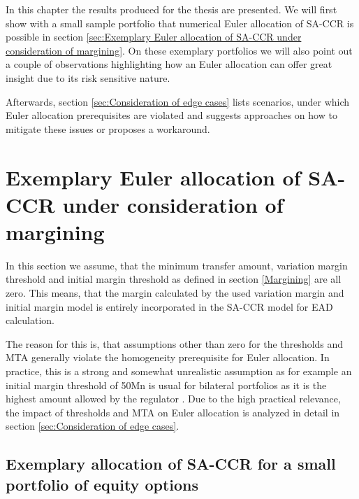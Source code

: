 \documentclass[../Thesis_AHoecherl.tex]{subfiles}
\begin{document}
    In this chapter the results produced for the thesis are presented. We will first show with a small sample portfolio that numerical Euler allocation of SA-CCR is possible in section \ref{sec:Exemplary Euler allocation of SA-CCR under consideration of margining}. On these exemplary portfolios we will also point out a couple of observations highlighting how an Euler allocation can offer great insight due to its risk sensitive nature.

    Afterwards, section \ref{sec:Consideration of edge cases} lists scenarios, under which Euler allocation prerequisites are violated and suggests approaches on how to mitigate these issues or proposes a workaround.

    \section{Exemplary Euler allocation of SA-CCR under consideration of margining\label{sec:Exemplary Euler allocation of SA-CCR under consideration of margining}}

    In this section we assume, that the minimum transfer amount, variation margin threshold and initial margin threshold as defined in section \ref{Margining} are all zero. This means, that the margin calculated by the used variation margin and initial margin model is entirely incorporated in the SA-CCR model for EAD calculation.

    The reason for this is, that assumptions other than zero for the thresholds and MTA generally violate the homogeneity prerequisite for Euler allocation. In practice, this is a strong and somewhat unrealistic assumption as for example an initial margin threshold of 50Mn is usual for bilateral portfolios as it is the highest amount allowed by the regulator \cite[Requirement 2.2]{BCBS_MarginRequirements}. Due to the high practical relevance, the impact of thresholds and MTA on Euler allocation is analyzed in detail in section \ref{sec:Consideration of edge cases}.   

    \subsection{Exemplary allocation of SA-CCR for a small portfolio of equity options\label{sec:Exemplary allocation of SA-CCR for a small portoflio of equity options}}

\end{document}
